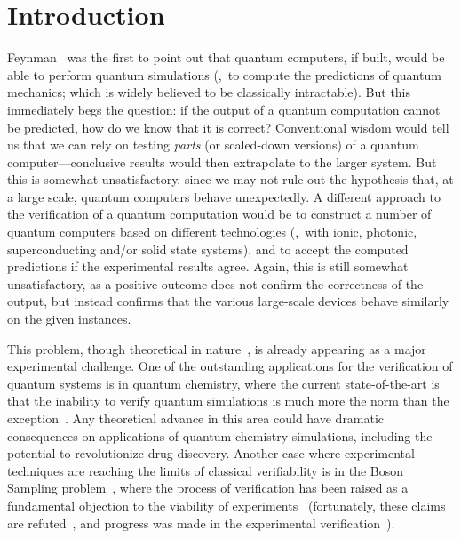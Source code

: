 \documentclass{toc}
\begin{document}
%
%
%

\section{Introduction}



Feynman~\cite{Fey82} was the first to point out that quantum computers, if built, would be able to perform quantum simulations (\ie,~to compute the predictions of quantum mechanics; which is widely believed to be classically intractable). But this immediately begs the question: if the output of a quantum computation cannot be predicted, how do we know that it is correct? Conventional wisdom would tell us that we can rely on testing \emph{parts} (or scaled-down versions) of a quantum computer---conclusive results would then extrapolate to the larger system. But this is somewhat unsatisfactory, since we may not rule out the hypothesis that, at a large scale, quantum computers behave unexpectedly. A different approach to the verification of a quantum computation would be to construct a number of quantum computers based on different technologies (\eg,~with ionic, photonic, superconducting and/or solid state systems), and to accept the computed predictions if the experimental results agree. Again, this is still somewhat unsatisfactory, as a positive outcome does not confirm the correctness of the output, but instead confirms that the various large-scale devices behave similarly on the given instances.

This problem, though theoretical in nature~\cite{AV14}, is already appearing as a major experimental challenge. One of the outstanding applications for the verification of quantum systems is in quantum chemistry, where the current state-of-the-art  is that the inability to verify quantum simulations is  much more the norm than the exception~\cite{GH05}. Any theoretical advance in this area could have dramatic consequences on applications of quantum chemistry simulations, including the potential to revolutionize drug discovery.
Another case where experimental techniques are reaching the limits of classical verifiability is in
the Boson Sampling problem~\cite{AA11}, where the process of verification has been raised as a fundamental objection to the viability of experiments~\cite{GKAE13} (fortunately, these claims are refuted~\cite{AA14}, and progress was made in the experimental verification~\cite{SVB+14}).
\end{document}
